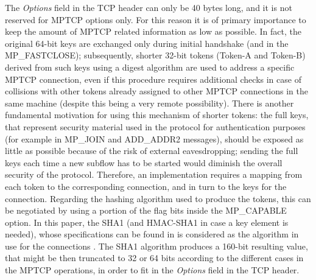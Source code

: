 The \textit{Options} field in the TCP header can only be 40 bytes long, and it is not reserved for MPTCP options only. For this reason it is of primary importance to keep the amount of MPTCP related information as low as possible. In fact, the original 64-bit keys are exchanged only during initial handshake (and in the MP\_FASTCLOSE); subsequently, shorter 32-bit tokens (Token-A and Token-B) derived from such keys using a digest algorithm are used to address a specific MPTCP connection, even if this procedure requires additional checks in case of collisions with other tokens already assigned to other MPTCP connections in the same machine (despite this being a very remote possibility). There is another fundamental motivation for using this mechanism of shorter tokens: the full keys, that represent security material used in the protocol for authentication purposes (for example in MP\_JOIN and ADD\_ADDR2 messages), should be exposed as little as possible because of the risk of external eavesdropping; sending the full keys each time a new subflow has to be started would diminish the overall security of the protocol. Therefore, an implementation requires a mapping from each token to the corresponding connection, and in turn to the keys for the connection.
Regarding the hashing algorithm used to produce the tokens, this can be negotiated by using a portion of the flag bits inside the MP\_CAPABLE option. In this paper, the SHA1 (and HMAC-SHA1 in case a key element is needed), whose specifications can be found in is considered as the algorithm in use for the connections \cite{rfc4634}. The SHA1 algorithm produces a 160-bit resulting value, that might be then truncated to 32 or 64 bits according to the different cases in the MPTCP operations, in order to fit in the \textit{Options} field in the TCP header.


